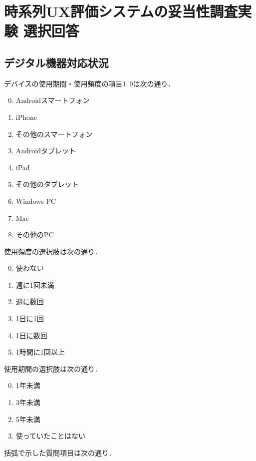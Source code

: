 \chapter{時系列UX評価システムの妥当性調査実験 選択回答}

\section{デジタル機器対応状況}

デバイスの使用期間・使用頻度の項目1~9は次の通り．

\begin{enumerate}
\setcounter{enumi}{-1}
\setlength{\parskip}{0cm}
  \setlength{\itemsep}{0cm}
  \item Androidスマートフォン
  \item iPhone
  \item その他のスマートフォン
  \item Androidタブレット
  \item iPad
  \item その他のタブレット
  \item Windows PC
  \item Mac
  \item その他のPC
\end{enumerate}

使用頻度の選択肢は次の通り．

\begin{enumerate}
\setcounter{enumi}{-1}
\setlength{\parskip}{0cm}
  \setlength{\itemsep}{0cm}
  \item 使わない
  \item 週に1回未満
  \item 週に数回
  \item 1日に1回
  \item 1日に数回
  \item 1時間に1回以上
\end{enumerate}

使用期間の選択肢は次の通り．

\begin{enumerate}
\setcounter{enumi}{-1}
\setlength{\parskip}{0cm}
  \setlength{\itemsep}{0cm}
  \item 1年未満
  \item 3年未満
  \item 5年未満
  \item 使っていたことはない
\end{enumerate}

括弧で示した質問項目は次の通り．\\


